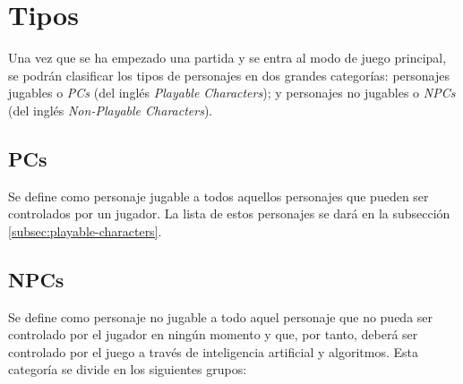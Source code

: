 \section{Tipos} %


Una vez que se ha empezado una partida y se entra al modo de juego principal, se
podrán clasificar los tipos de personajes en dos grandes categorías: personajes
jugables o \emph{PCs} (del inglés \emph{Playable Characters}); y personajes no
jugables o \emph{NPCs} (del inglés \emph{Non-Playable Characters}).

\subsection{PCs} %

Se define como personaje jugable a todos aquellos personajes que pueden ser
controlados por un jugador. La lista de estos personajes se dará en la
subsección \ref{subsec:playable-characters}.

\subsection{NPCs} %

Se define como personaje no jugable a todo aquel personaje que no pueda ser
controlado por el jugador en ningún momento y que, por tanto, deberá ser
controlado por el juego a través de inteligencia artificial y algoritmos. Esta
categoría se divide en los siguientes grupos:

